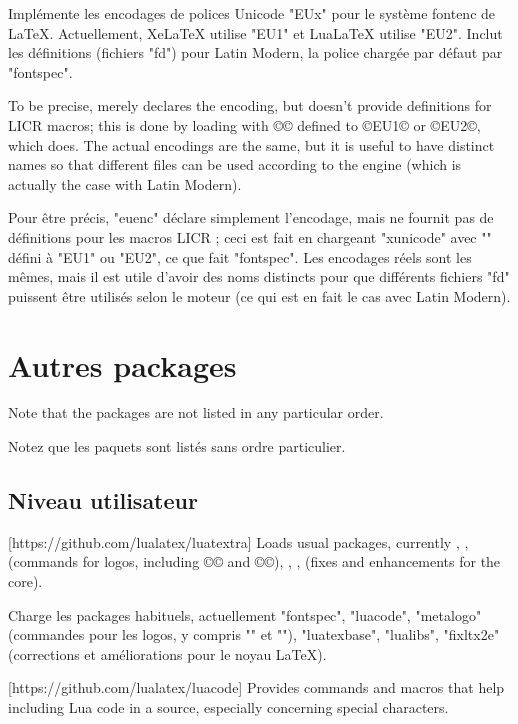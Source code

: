 \documentclass{lltxdoc}
\begin{document}
Implémente les encodages de polices Unicode "EUx" pour le système fontenc de LaTeX. Actuellement, XeLaTeX utilise "EU1" et LuaLaTeX utilise "EU2". Inclut les définitions (fichiers "fd") pour Latin Modern, la police chargée par défaut par "fontspec".

To be precise,  merely declares the encoding, but
doesn't provide definitions for LICR macros; this is done by loading
 with ©\UTFencname© defined to ©EU1© or ©EU2©, which
 does. The actual encodings are the same, but it is useful to
have distinct names so that different  files can be used according to
the engine (which is actually the case with Latin Modern).

Pour être précis, "euenc" déclare simplement l'encodage, mais ne fournit pas de définitions pour les macros LICR ; ceci est fait en chargeant "xunicode" avec "\UTFencname" défini à "EU1" ou "EU2", ce que fait "fontspec". Les encodages réels sont les mêmes, mais il est utile d'avoir des noms distincts pour que différents fichiers "fd" puissent être utilisés selon le moteur (ce qui est en fait le cas avec Latin Modern).

\section{Autres packages}\label{other}

Note that the packages are not listed in any particular order.

Notez que les paquets sont listés sans ordre particulier.

\subsection{Niveau utilisateur}

[https://github.com/lualatex/luatextra]
Loads usual packages, currently , , 
(commands for logos, including ©\LuaTeX© and ©\LuaLaTeX©), ,
,  (fixes and enhancements for the \latex core).

Charge les packages habituels, actuellement "fontspec", "luacode", "metalogo" (commandes pour les logos, y compris "\LuaTeX" et "\LuaLaTeX"), "luatexbase", "lualibs", "fixltx2e" (corrections et améliorations pour le noyau LaTeX).

[https://github.com/lualatex/luacode]
Provides commands and macros that help including Lua code in a \tex source,
especially concerning special characters.
\end{document}
